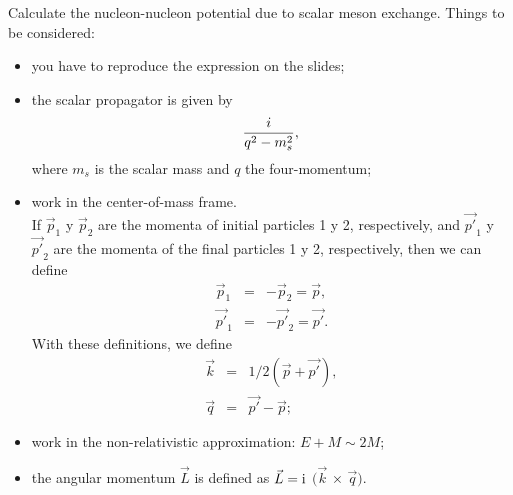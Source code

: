
Calculate the nucleon-nucleon potential due to scalar meson exchange.
Things to be considered:
\begin{itemize}
    \item you have to reproduce the expression on the slides;
    \item the scalar propagator is given by
          \begin{equation}
              \frac{i}{q^2-m^2_s},  \nonumber \\
          \end{equation}
          where $m_s$ is the scalar mass and $q$ the four-momentum;
    \item work in the center-of-mass frame. \\
          If $\vec{p}_1$ y $\vec{p}_2$ are the momenta of initial particles 1 y 2, respectively, and  $\vec{p'}_1$ y $\vec{p'}_2$ are the momenta of the final particles 1 y 2, respectively, then we can define
          \begin{eqnarray}
              \vec{p}_1&=&-\vec{p}_2=\vec{p}, \nonumber \\
              \vec{p'}_1&=&-\vec{p'}_2=\vec{p'}. \nonumber
          \end{eqnarray}
          With these definitions, we define
          \begin{eqnarray}
              \vec{k}&=&1/2(\vec{p}+\vec{p'}), \nonumber \\
              \vec{q}&=&\vec{p'}-\vec{p}; \nonumber
          \end{eqnarray}
    \item work in the non-relativistic approximation: $E+M \sim 2 M$;
    \item the angular momentum $\vec{L}$ is defined as $\vec{L}=\rm{i}$ $(\vec{k}$ $\times$ $\vec{q})$.
\end{itemize}
